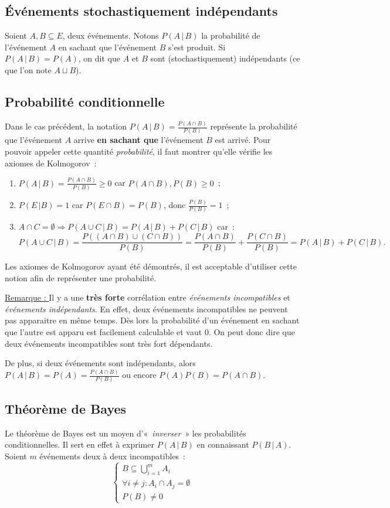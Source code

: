 \documentclass{article}
\begin{document}
	\subsection{Événements stochastiquement indépendants}
		Soient $A, B \subseteq E$, deux événements. Notons $P(A \, | \, B)$ la probabilité de l'événement $A$ en sachant que l'événement $B$ s'est produit.
		Si $P(A \, | \, B) = P(A)$, on dit que $A$ et $B$ sont (stochastiquement) indépendants (ce que l'on note $A \sqcup B$).

	\subsection{Probabilité conditionnelle}
		Dans le cas précédent, la notation $P(A \, | \, B) = \frac {P(A \cap B)}{P(B)}$ représente la probabilité que l'événement $A$ arrive \textbf{en sachant que}
		l'événement $B$ est arrivé. Pour pouvoir appeler cette quantité \textit{probabilité}, il faut montrer qu'elle vérifie les axiomes de Kolmogorov~:
		\begin{enumerate}
			\item $P(A \, | \, B) = \frac {P(A \cap B)}{P(B)} \geq 0$ car $P(A \cap B), P(B) \geq 0$~;
			\item $P(E \, | B) = 1$ car $P(E \cap B) = P(B)$, donc $\frac {P(B)}{P(B)} = 1$~;
			\item $A \cap C = \emptyset \Rightarrow P(A \cup C \, | \, B) = P(A \, | \, B) + P(C \, | \, B)$ car~:
			\[P(A \cup C \, | \, B) = \frac {P((A \cap B) \cup (C \cap B))}{P(B)} = \frac {P(A \cap B)}{P(B)}
				+ \frac {P(C \cap B)}{P(B)} = P(A\, | \, B) + P(C \, | \, B).\]
		\end{enumerate}

		Les axiomes de Kolmogorov ayant été démontrés, il est acceptable d'utiliser cette notion afin de représenter une probabilité.

		\underline{Remarque : } Il y a une \textbf{très forte} corrélation entre \textit{événements incompatibles} et \textit{événements indépendants}. En effet, deux
		événements incompatibles ne peuvent pas apparaitre en même temps. Dès lors la probabilité d'un événement en sachant que l'autre est apparu est facilement
		calculable et vaut $0$. On peut donc dire que deux événements incompatibles sont très fort dépendants.

		De plus, si deux événements sont indépendants, alors $P(A \, | \, B) = P(A)= \frac {P(A \cap B)}{P(B)}$ ou encore $P(A)P(B) = P(A \cap B)$.

	\subsection{Théorème de Bayes}
		Le théorème de Bayes est un moyen d'«~\textit{inverser}~» les probabilités conditionnelles. Il sert en effet à exprimer $P(A \, | \, B)$ en connaissant
		$P(B  \, | \, A)$. Soient $m$ événements deux à deux incompatibles~:
		\[\left\{\begin{aligned}
			B \subseteq \bigcup_{i=1}^mA_i \\
			\forall i \neq j : A_i \cap A_j = \emptyset \\
			P(B) \neq 0
		\end{aligned}\right.\]
\end{document}
